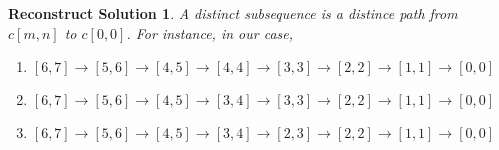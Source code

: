 \documentclass[a4paper, titlepage]{article}
\begin{document}
\newtheorem*{recon}{Reconstruct Solution}
\begin{recon}
A distinct subsequence is a distince path from $c[m,n]$ to $c[0,0]$. For instance, in our case, 
\begin{enumerate}
	\item $[6,7] \rightarrow [5, 6] \rightarrow [4, 5] \rightarrow [4, 4] \rightarrow [3, 3] \rightarrow [2, 2] \rightarrow [1, 1] \rightarrow [0,0]$ 
	\item $[6,7] \rightarrow [5, 6] \rightarrow [4, 5] \rightarrow [3, 4] \rightarrow [3, 3] \rightarrow [2, 2] \rightarrow [1, 1] \rightarrow [0,0]$
	\item $[6,7] \rightarrow [5, 6] \rightarrow [4, 5] \rightarrow [3, 4] \rightarrow [2, 3] \rightarrow [2, 2] \rightarrow [1, 1] \rightarrow [0,0]$
\end{enumerate}
\end{recon}
\end{document}
